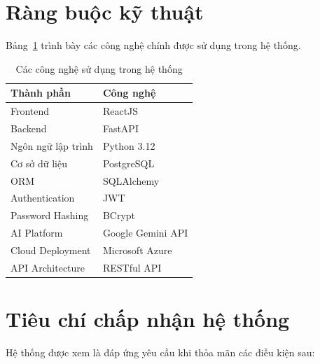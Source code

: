\section{Ràng buộc kỹ thuật}

Bảng~\ref{tab:technology} trình bày các công nghệ chính được sử dụng trong hệ
thống.

\begin{table}[H]
\centering
\caption{Các công nghệ sử dụng trong hệ thống}
\label{tab:technology}

\begin{tabular}{|p{6cm}|p{8cm}|}
\hline
\textbf{Thành phần} & \textbf{Công nghệ} \\ \hline

Frontend & ReactJS \\ \hline

Backend & FastAPI \\ \hline

Ngôn ngữ lập trình & Python 3.12 \\ \hline

Cơ sở dữ liệu & PostgreSQL \\ \hline

ORM & SQLAlchemy \\ \hline

Authentication & JWT \\ \hline

Password Hashing & BCrypt \\ \hline

AI Platform & Google Gemini API \\ \hline

Cloud Deployment & Microsoft Azure \\ \hline

API Architecture & RESTful API \\ \hline

\end{tabular}

\end{table}


\section{Tiêu chí chấp nhận hệ thống}

Hệ thống được xem là đáp ứng yêu cầu khi thỏa mãn các điều kiện sau:

